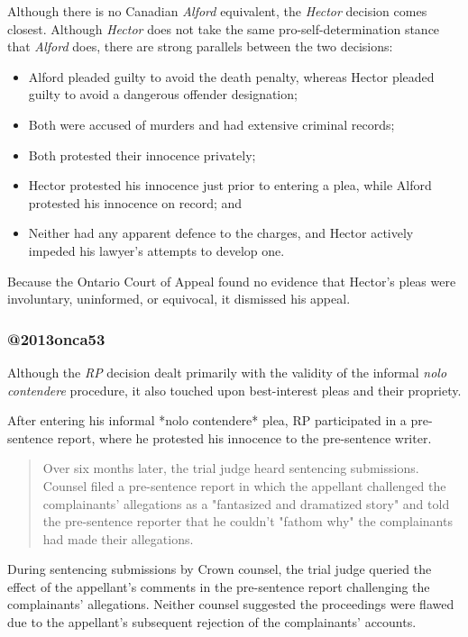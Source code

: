 Although there is no Canadian \textit{Alford} equivalent, the \textit{Hector} decision comes closest. Although \textit{Hector} does not take the same pro-self-determination stance that \textit{Alford} does, there are strong parallels between the two decisions:

\begin{itemize}
    \item Alford pleaded guilty to avoid the death penalty, whereas Hector pleaded guilty to avoid a dangerous offender designation;
    \item Both were accused of murders and had extensive criminal records;
    \item Both protested their innocence privately;
    \item Hector protested his innocence just prior to entering a plea, while Alford protested his innocence on record; and
    \item Neither had any apparent defence to the charges, and Hector actively impeded his lawyer's attempts to develop one.
\end{itemize}

Because the Ontario Court of Appeal found no evidence that Hector's pleas were involuntary, uninformed, or equivocal, it dismissed his appeal. 

\subsubsection{@2013onca53}

Although the \textit{RP} decision dealt primarily with the validity of the informal \textit{nolo contendere} procedure, it also touched upon best-interest pleas and their propriety. 

After entering his informal *nolo contendere* plea, RP participated in a pre-sentence report, where he protested his innocence to the pre-sentence writer.

\begin{quote}
    Over six months later, the trial judge heard sentencing submissions. Counsel filed a pre-sentence report in which the appellant challenged the complainants' allegations as a "fantasized and dramatized story" and told the pre-sentence reporter that he couldn't "fathom why" the complainants had made their allegations.
\end{quote}

During sentencing submissions by Crown counsel, the trial judge queried the effect of the appellant's comments in the pre-sentence report challenging the complainants' allegations. Neither counsel suggested the proceedings were flawed due to the appellant's subsequent rejection of the complainants' accounts.

